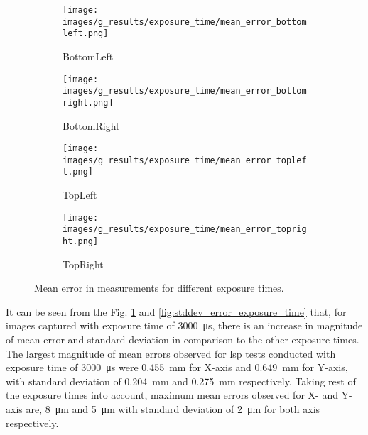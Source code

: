     \begin{figure}[ht]
        \centering
        \begin{subfigure}[b]{0.46\textwidth}
            \centering
            \texttt{[image: images/g\_results/exposure\_time/mean\_error\_bottomleft.png]}
            \caption{\textsf{BottomLeft}}
        \end{subfigure}
        \hspace{1cm}
        \begin{subfigure}[b]{0.46\textwidth}
            \centering
            \texttt{[image: images/g\_results/exposure\_time/mean\_error\_bottomright.png]}
            \caption{\textsf{BottomRight}}
        \end{subfigure}

        \vspace{5mm}
        
        \begin{subfigure}[b]{0.46\textwidth}
            \centering
            \texttt{[image: images/g\_results/exposure\_time/mean\_error\_topleft.png]}
            \caption{\textsf{TopLeft}}
        \end{subfigure}
        \hspace{1cm}
        \begin{subfigure}[b]{0.46\textwidth}
            \centering
            \texttt{[image: images/g\_results/exposure\_time/mean\_error\_topright.png]}
            \caption{\textsf{TopRight}}
        \end{subfigure}

        \caption{Mean error in measurements for different exposure times.}
        \label{fig:mean_error_exposure_time}
    \end{figure}

    \vspace{5mm}
    \noindent It can be seen from the Fig. \ref{fig:mean_error_exposure_time} and \ref{fig:stddev_error_exposure_time} that, for images captured with exposure time of \SI{3000}{\micro\second}, there is an increase in magnitude of mean error and standard deviation in comparison to the other exposure times. The largest magnitude of mean errors observed for \gls{lsp} tests conducted with exposure time of \SI{3000}{\micro\second} were \SI{0.455}{\milli\meter} for X-axis and \SI{0.649}{\milli\meter} for Y-axis, with standard deviation of \SI{0.204}{\milli\meter} and \SI{0.275}{\milli\meter} respectively. Taking rest of the exposure times into account, maximum mean errors observed for X- and Y-axis are, \SI{8}{\micro\meter} and \SI{5}{\micro\meter} with standard deviation of \SI{2}{\micro\meter} for both axis respectively. 

